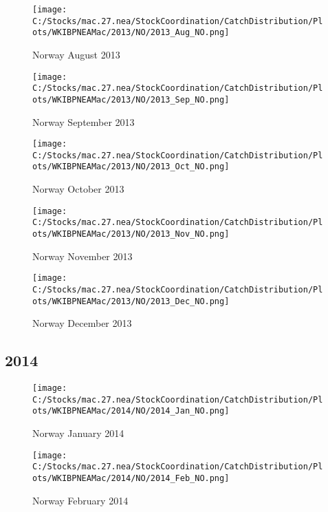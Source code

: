 \documentclass{article}
\begin{document}
\begin{figure}
	\centering
		\texttt{[image: C:/Stocks/mac.27.nea/StockCoordination/CatchDistribution/Plots/WKIBPNEAMac/2013/NO/2013\_Aug\_NO.png]}
	\caption{Norway August 2013}
	\label{fig:2013_Aug_NO}
\end{figure}

\begin{figure}
	\centering
		\texttt{[image: C:/Stocks/mac.27.nea/StockCoordination/CatchDistribution/Plots/WKIBPNEAMac/2013/NO/2013\_Sep\_NO.png]}
	\caption{Norway September 2013}
	\label{fig:2013_Sep_NO}
\end{figure}

\begin{figure}
	\centering
		\texttt{[image: C:/Stocks/mac.27.nea/StockCoordination/CatchDistribution/Plots/WKIBPNEAMac/2013/NO/2013\_Oct\_NO.png]}
	\caption{Norway October 2013}
	\label{fig:2013_Oct_NO}
\end{figure}

\begin{figure}
	\centering
		\texttt{[image: C:/Stocks/mac.27.nea/StockCoordination/CatchDistribution/Plots/WKIBPNEAMac/2013/NO/2013\_Nov\_NO.png]}
	\caption{Norway November 2013}
	\label{fig:2013_Nov_NO}
\end{figure}

\begin{figure}
	\centering
		\texttt{[image: C:/Stocks/mac.27.nea/StockCoordination/CatchDistribution/Plots/WKIBPNEAMac/2013/NO/2013\_Dec\_NO.png]}
	\caption{Norway December 2013}
	\label{fig:2013_Dec_NO}
\end{figure}

\clearpage

\newpage

\subsection{2014}



\begin{figure}[h]
	\centering
		\texttt{[image: C:/Stocks/mac.27.nea/StockCoordination/CatchDistribution/Plots/WKIBPNEAMac/2014/NO/2014\_Jan\_NO.png]}
	\caption{Norway January 2014}
	\label{fig:2014_Jan_NO}
\end{figure}

\begin{figure}
	\centering
		\texttt{[image: C:/Stocks/mac.27.nea/StockCoordination/CatchDistribution/Plots/WKIBPNEAMac/2014/NO/2014\_Feb\_NO.png]}
	\caption{Norway February 2014}
	\label{fig:2014_Feb_NO}
\end{figure}
\end{document}
